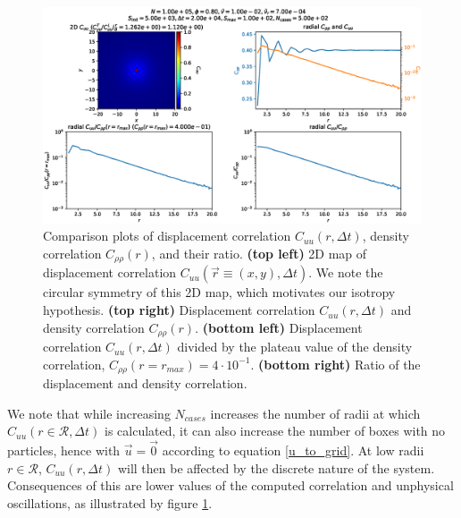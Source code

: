 \documentclass[class=report, float=false, crop=false]{standalone}
\begin{document}
\begin{figure}[h!]
\includegraphics[width=\textwidth]{figures/figs/Cuub_Dk8000_Vj1000_Rh7000_Nq1000_Io5000_Tn2000_Mn1000_Cn5000_LINLOG.eps}
\caption{Comparison plots of displacement correlation $C_{uu}(r, \Delta t)$, density correlation $C_{\rho\rho}(r)$, and their ratio. \textbf{(top left)} 2D map of displacement correlation $C_{uu}(\vec{r} \equiv (x, y), \Delta t)$. We note the circular symmetry of this 2D map, which motivates our isotropy hypothesis. \textbf{(top right)} Displacement correlation $C_{uu}(r, \Delta t)$ and density correlation $C_{\rho\rho}(r)$. \textbf{(bottom left)} Displacement correlation $C_{uu}(r, \Delta t)$ divided by the plateau value of the density correlation, $C_{\rho\rho}(r = r_{max}) = 4\cdot10^{-1}$. \textbf{(bottom right)} Ratio of the displacement and density correlation.}
\label{cuu_oscillations}
\end{figure}

We note that while increasing $N_{cases}$ increases the number of radii at which $C_{uu}(r \in \mathcal{R}, \Delta t)$ is calculated, it can also increase the number of boxes with no particles, hence with $\vec{u} = \vec{0}$ according to equation \ref{u_to_grid}. At low radii $r \in \mathcal{R}$, $C_{uu}(r, \Delta t)$ will then be affected by the discrete nature of the system. Consequences of this are lower values of the computed correlation and unphysical oscillations, as illustrated by figure \ref{cuu_oscillations}.\\
\end{document}
